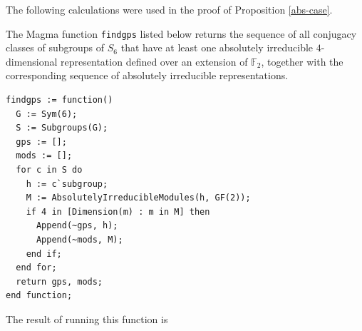 \documentclass{amsart}
\theoremstyle{definition}
\newcommand{\F}{\mathbb{F}}
\begin{document}
The following calculations were used in the proof of Proposition \ref{abs-case}.

The Magma function \texttt{findgps} listed below returns the sequence of all conjugacy classes of subgroups of $S_6$ that have at least one absolutely irreducible $4$-dimensional representation defined over an extension of $\F_2$, together with the corresponding sequence of absolutely irreducible representations.

\begin{verbatim}
findgps := function()
  G := Sym(6);
  S := Subgroups(G);
  gps := [];
  mods := [];
  for c in S do
    h := c`subgroup;
    M := AbsolutelyIrreducibleModules(h, GF(2));
    if 4 in [Dimension(m) : m in M] then
      Append(~gps, h);
      Append(~mods, M);
    end if;
  end for;
  return gps, mods;
end function;
\end{verbatim}

The result of running this function is
\end{document}
